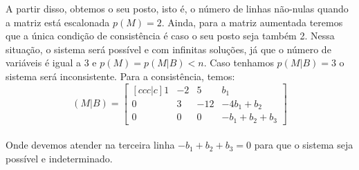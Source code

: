 A partir disso, obtemos o seu posto, isto é, o número de linhas não-nulas quando a matriz está escalonada $p(M) = 2$. Ainda, para a matriz aumentada teremos que a única condição de consistência é caso o seu posto seja também 2. Nessa situação, o sistema será possível e com infinitas soluções, já que o número de variáveis é igual a 3 e $p(M)=p(M|B)<n$. Caso tenhamos $p(M|B)=3$ o sistema será inconsistente. Para a consistência, temos:
\\

\[
    (M|B) =
    \begin{bmatrix}[ccc|c]
        1 & -2 & 5   & b_1          \\
        0 & 3  & -12 & -4b_1+b_2    \\
        0 & 0  & 0   & -b_1+b_2+b_3
    \end{bmatrix}
\]
\\

Onde devemos atender na terceira linha $-b_1+b_2+b_3=0$ para que o sistema seja possível e indeterminado.
\\